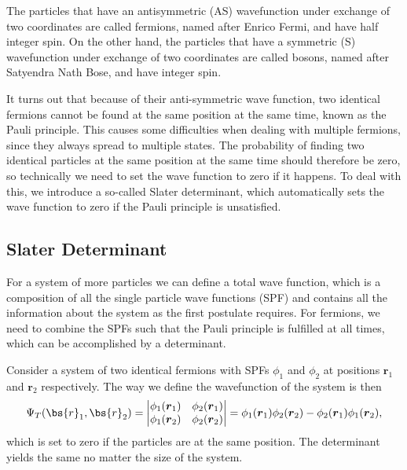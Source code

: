 The particles that have an antisymmetric (AS) wavefunction under exchange of two coordinates are called fermions, named after Enrico Fermi, and have half integer spin. On the other hand, the particles that have a symmetric (S) wavefunction under exchange of two coordinates are called bosons, named after Satyendra Nath Bose, and have integer spin. 

It turns out that because of their anti-symmetric wave function, two identical fermions cannot be found at the same position at the same time, known as the Pauli principle. This causes some difficulties when dealing with multiple fermions, since they always spread to multiple states. The probability of finding two identical particles at the same position at the same time should therefore be zero, so technically we need to set the wave function to zero if it happens. To deal with this, we introduce a so-called Slater determinant, which automatically sets the wave function to zero if the Pauli principle is unsatisfied.

\subsection{Slater Determinant} \label{subsec:slater}
For a system of more particles we can define a total wave function, which is a composition of all the single particle wave functions (SPF) and contains all the information about the system as the first postulate requires. For fermions, we need to combine the SPFs such that the Pauli principle is fulfilled at all times, which can be accomplished by a determinant. 

Consider a system of two identical fermions with SPFs $\phi_1$ and $\phi_2$ at positions $\boldsymbol{r}_1$ and $\boldsymbol{r}_2$ respectively. The way we define the wavefunction of the system is then
\begin{equation}
\Psi_T(\bs{r}_1,\bs{r}_2)=
\begin{vmatrix}
\phi_1(\boldsymbol{r}_1) & \phi_2(\boldsymbol{r}_1)\\
\phi_1(\boldsymbol{r}_2) & \phi_2(\boldsymbol{r}_2)
\end{vmatrix}
=\phi_1(\boldsymbol{r}_1)\phi_2(\boldsymbol{r}_2)-\phi_2(\boldsymbol{r}_1)\phi_1(\boldsymbol{r}_2),
\end{equation}
which is set to zero if the particles are at the same position. The determinant yields the same no matter the size of the system.

